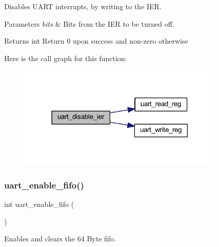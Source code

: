 Disables U\+A\+RT interrupts, by writing to the I\+ER. 


\begin{DoxyParams}{Parameters}
{\em bits} & Bits from the I\+ER to be turned off. \\
\hline
\end{DoxyParams}
\begin{DoxyReturn}{Returns}
int Return 0 upon success and non-\/zero otherwise 
\end{DoxyReturn}
Here is the call graph for this function\+:\nopagebreak
\begin{figure}[H]
\begin{center}
\leavevmode
\includegraphics[width=278pt]{group__uart_gaf05ac9402cb47de033844fb3f86beb31_cgraph}
\end{center}
\end{figure}
\mbox{\label{group__uart_gacc4e9858f70ddd58ddb77dd4f7cc034d}} 
\subsubsection{\texorpdfstring{uart\+\_\+enable\+\_\+fifo()}{uart\_enable\_fifo()}}
{\footnotesize\ttfamily int uart\+\_\+enable\+\_\+fifo (\begin{DoxyParamCaption}{ }\end{DoxyParamCaption})}



Enables and clears the 64 Byte fifo. 

